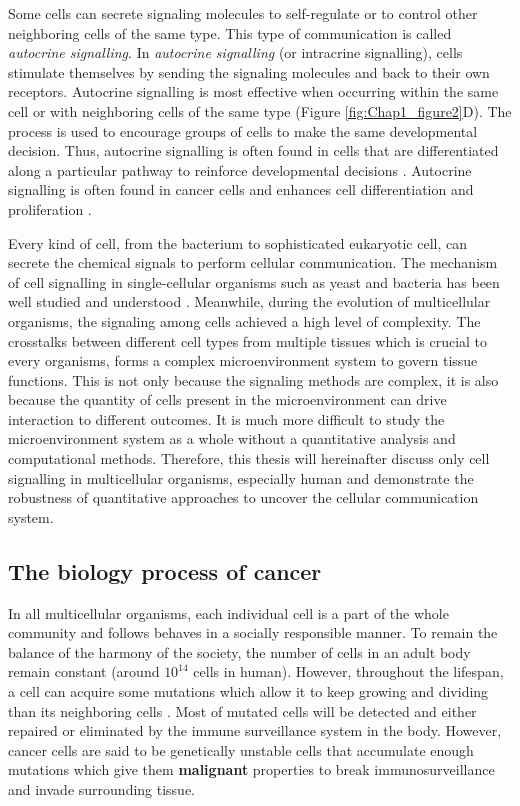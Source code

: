 Some cells can secrete signaling molecules to self-regulate or to control other neighboring cells of the same type. This type of communication is called \textit{autocrine signalling}. In \textit{autocrine signalling} (or intracrine signalling), cells stimulate themselves by sending the signaling molecules and back to their own receptors. Autocrine signalling is most effective when occurring within the same cell or with neighboring cells of the same type (Figure \ref{fig:Chap1_figure2}D). The process is used to encourage groups of cells to make the same developmental decision. Thus, autocrine signalling is often found in cells that are differentiated along a particular pathway to reinforce developmental decisions \cite{alberts2018molecular}. Autocrine signalling is often found in cancer cells and enhances cell differentiation and proliferation \cite{sporn1985autocrine}.  

Every kind of cell, from the bacterium to sophisticated eukaryotic cell, can secrete the chemical signals to perform cellular communication. The mechanism of cell signalling in single-cellular organisms such as yeast and bacteria has been well studied and understood \cite{alberts2018molecular}. Meanwhile, during the evolution of multicellular organisms, the signaling among cells achieved a high level of complexity. The crosstalks between different cell types from multiple tissues which is crucial to every organisms, forms a complex microenvironment system to govern tissue functions. This is not only because the signaling methods are complex, it is also because the quantity of cells present in the microenvironment can drive interaction to different outcomes. It is much more difficult to study the microenvironment system as a whole without a quantitative analysis and computational methods. Therefore, this thesis will hereinafter discuss only cell signalling in multicellular organisms, especially human and demonstrate the robustness of quantitative approaches to uncover the cellular communication system. 

\subsection{The biology process of cancer}
In all multicellular organisms, each individual cell is a part of the whole community and follows behaves in a socially responsible manner. To remain the balance of the harmony of the society, the number of cells in an adult body remain constant (around $10^{14}$ cells in human). However, throughout the lifespan, a cell can acquire some mutations which allow it to keep growing and dividing than its neighboring cells \cite{alberts2018molecular, greaves2012clonal}. Most of mutated cells will be detected and either repaired or eliminated by the immune surveillance system in the body. However, cancer cells are said to be genetically unstable cells that accumulate enough mutations which give them \textbf{malignant} properties to break immunosurveillance and invade surrounding tissue. 

